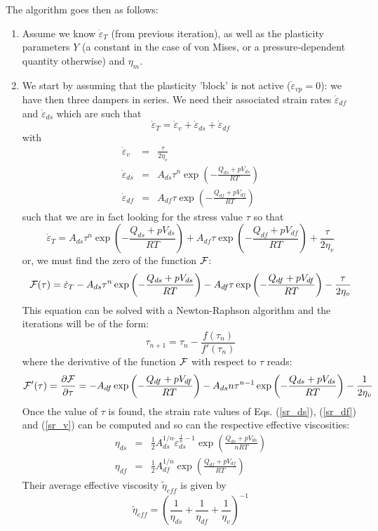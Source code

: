 \begin{itemize}
The algorithm goes then as follows:
\begin{enumerate}
\item Assume we know $\dot\varepsilon_T$ (from previous iteration), 
as well as the plasticity parameters $Y$ (a constant in the case of von Mises, or a pressure-dependent 
quantity otherwise) and $\eta_m$.
\item We start by assuming that the plasticity 'block' is not active ($\dot{\varepsilon}_{vp}=0$): we have then three dampers in series. 
We need their associated strain rates 
$\dot{\varepsilon}_{df}$ and $\dot{\varepsilon}_{ds}$ which are such that 
\[
\dot\varepsilon_T = 
\dot\varepsilon_v + \dot\varepsilon_{ds} + \dot\varepsilon_{df} 
\]
with
\begin{eqnarray}
\dot\varepsilon_v &=& \frac{\tau}{2 \eta_v} \label{sr_v} \\
\dot\varepsilon_{ds}  &=& A_{ds} \tau^n \exp \left(-\frac{Q_{ds}+pV_{ds}}{RT}\right) \label{sr_ds} \\
\dot\varepsilon_{df}  &=& A_{df} \tau   \exp \left(-\frac{Q_{df}+pV_{df}}{RT}\right) \label{sr_df} 
\end{eqnarray}
such that we are in fact looking for the stress value $\tau$ so that 
\[
\dot\varepsilon_T = 
A_{ds} \tau^n \exp \left(-\frac{Q_{ds}+p V_{ds}}{RT}\right) 
+
A_{df} \tau   \exp \left(-\frac{Q_{df}+p V_{df}}{RT}\right) 
+
\frac{\tau}{2 \eta_v}
\]
or, we must find the zero of the function ${\cal F}$: 
\[
{\cal F}(\tau) = 
\dot\varepsilon_T 
- A_{ds} \tau^n \exp \left(-\frac{Q_{ds}+p V_{ds}}{RT}\right) 
- A_{df} \tau   \exp \left(-\frac{Q_{df}+p V_{df}}{RT}\right) 
- \frac{\tau}{2 \eta_v} 
\]
This equation can be solved with a Newton-Raphson algorithm
and the iterations will be of the form:
\[
\tau_{n+1} = \tau_n - \frac{f(\tau_n)}{f'(\tau_n)}
\]
where the derivative of the function ${\cal F}$ with respect to $\tau$ reads:
\[
{\cal F}'(\tau)=\frac{\partial {\cal F}}{\partial \tau}=
- A_{df} \exp\left(-\frac{Q_{df}+pV_{df}}{RT}\right) 
- A_{ds} n \tau^{n-1} \exp\left(-\frac{Q_{ds}+pV_{ds}}{RT}\right)
- \frac{1}{2\eta_v}
\]
Once the value of $\tau$ is found, 
the strain rate values of Eqs. (\ref{sr_ds}), (\ref{sr_df}) and (\ref{sr_v}) 
can be computed and so can the respective effective viscosities:
\begin{eqnarray}
\eta_{ds} 
&=& \frac{1}{2} A_{ds}^{1/n} \dot\varepsilon_{ds}^{\frac{1}{n}-1} \exp \left(\frac{Q_{ds}+pV_{ds}}{nRT}\right) \\
\eta_{df} 
&=& \frac{1}{2} A_{df}^{1/n}  \exp \left(\frac{Q_{df}+pV_{df}}{RT}\right) 
\end{eqnarray}
Their average effective viscosity $\tilde{\eta}_{eff}$ is given by 
\[
\tilde{\eta}_{eff} = \left( \frac{1}{\eta_{ds}} + \frac{1}{\eta_{df}} + \frac{1}{\eta_v} \right)^{-1}
\]



\end{enumerate}
\end{itemize}

